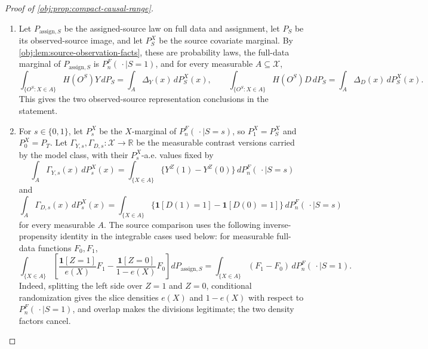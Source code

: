 \documentclass[11pt]{article}
\begin{document}
\begin{proof}[Proof of \cref{obj:prop:compact-causal-range}]
\begin{enumerate}
\item Let \(P_{\mathrm{assign},S}\) be the assigned-source law on full data and assignment, let \(P_S\) be its observed-source image, and let \(P_S^X\) be the source covariate marginal.  By \cref{obj:lem:source-observation-facts}, these are probability laws, the full-data marginal of \(P_{\mathrm{assign},S}\) is \(P_n^F(\,\cdot\mid S=1)\), and for every measurable \(A\subseteq\mathcal X\),
\[
\int_{\{O^S:X\in A\}}H(O^S)Y\,dP_S
=
\int_A\Delta_Y(x)\,dP_S^X(x),
\qquad
\int_{\{O^S:X\in A\}}H(O^S)D\,dP_S
=
\int_A\Delta_D(x)\,dP_S^X(x).
\]
This gives the two observed-source representation conclusions in the statement. %

\item For \(s\in\{0,1\}\), let \(P_s^X\) be the \(X\)-marginal of \(P_n^F(\,\cdot\mid S=s)\), so \(P_1^X=P_S^X\) and \(P_0^X=P_T\).  Let \(\Gamma_{Y,s},\Gamma_{D,s}:\mathcal X\to\mathbb R\) be the measurable contrast versions carried by the model class, with their \(P_s^X\)-a.e. values fixed by
\[
\int_A \Gamma_{Y,s}(x)\,dP_s^X(x)
=
\int_{\{X\in A\}}\{Y^Z(1)-Y^Z(0)\}\,dP_n^F(\,\cdot\mid S=s)
\]
and
\[
\int_A \Gamma_{D,s}(x)\,dP_s^X(x)
=
\int_{\{X\in A\}}\{\mathbf 1[D(1)=1]-\mathbf 1[D(0)=1]\}\,dP_n^F(\,\cdot\mid S=s)
\]
for every measurable \(A\).  The source comparison uses the following inverse-propensity identity in the integrable cases used below: for measurable full-data functions \(F_0,F_1\),
\[
\int_{\{X\in A\}}
\left[
\frac{\mathbf 1[Z=1]}{e(X)}F_1
-
\frac{\mathbf 1[Z=0]}{1-e(X)}F_0
\right] dP_{\mathrm{assign},S}
=
\int_{\{X\in A\}}(F_1-F_0)\,dP_n^F(\,\cdot\mid S=1).
\]
Indeed, splitting the left side over \(Z=1\) and \(Z=0\), conditional randomization gives the slice densities \(e(X)\) and \(1-e(X)\) with respect to \(P_n^F(\,\cdot\mid S=1)\), and overlap makes the divisions legitimate; the two density factors cancel.


\end{enumerate}
\end{proof}
\end{document}
